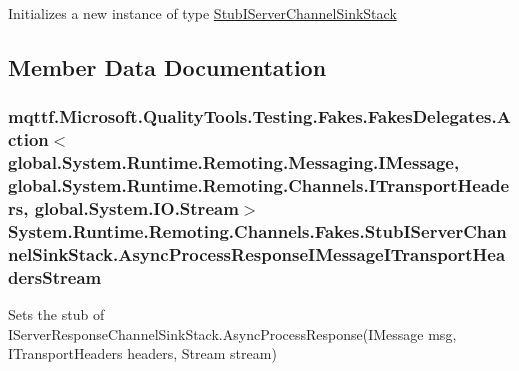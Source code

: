Initializes a new instance of type \hyperlink{class_system_1_1_runtime_1_1_remoting_1_1_channels_1_1_fakes_1_1_stub_i_server_channel_sink_stack}{Stub\-I\-Server\-Channel\-Sink\-Stack}



\subsection{Member Data Documentation}
\hypertarget{class_system_1_1_runtime_1_1_remoting_1_1_channels_1_1_fakes_1_1_stub_i_server_channel_sink_stack_a697b1cb920d7baef005690c3f9bff9d5}{
\subsubsection[{Async\-Process\-Response\-I\-Message\-I\-Transport\-Headers\-Stream}]{\setlength{\rightskip}{0pt plus 5cm}mqttf.\-Microsoft.\-Quality\-Tools.\-Testing.\-Fakes.\-Fakes\-Delegates.\-Action$<$global.\-System.\-Runtime.\-Remoting.\-Messaging.\-I\-Message, global.\-System.\-Runtime.\-Remoting.\-Channels.\-I\-Transport\-Headers, global.\-System.\-I\-O.\-Stream$>$ System.\-Runtime.\-Remoting.\-Channels.\-Fakes.\-Stub\-I\-Server\-Channel\-Sink\-Stack.\-Async\-Process\-Response\-I\-Message\-I\-Transport\-Headers\-Stream}}\label{class_system_1_1_runtime_1_1_remoting_1_1_channels_1_1_fakes_1_1_stub_i_server_channel_sink_stack_a697b1cb920d7baef005690c3f9bff9d5}


Sets the stub of I\-Server\-Response\-Channel\-Sink\-Stack.\-Async\-Process\-Response(\-I\-Message msg, I\-Transport\-Headers headers, Stream stream)


